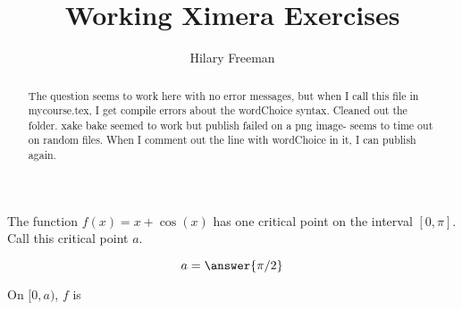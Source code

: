 \documentclass[handout]{ximera}
\title{Working Ximera Exercises}
\author{Hilary Freeman}
\begin{document}
\begin{abstract}
  The question seems to work here with no error messages, but when I call this file in mycourse.tex, I get compile errors about the wordChoice syntax.  Cleaned out the folder. xake bake seemed to work but publish failed on a png image- seems to time out on random files. When I comment out the line with wordChoice in it, I can publish again.
\end{abstract}
\maketitle



\begin{exercise}
The function $f(x) =x+\cos(x)$ has one critical point on the interval $[0,\pi]$. Call this critical point $a$.

$$
a = \answer{\pi/2}
$$

On $[0,a)$, $f$ is 



\end{exercise}
\end{document}
